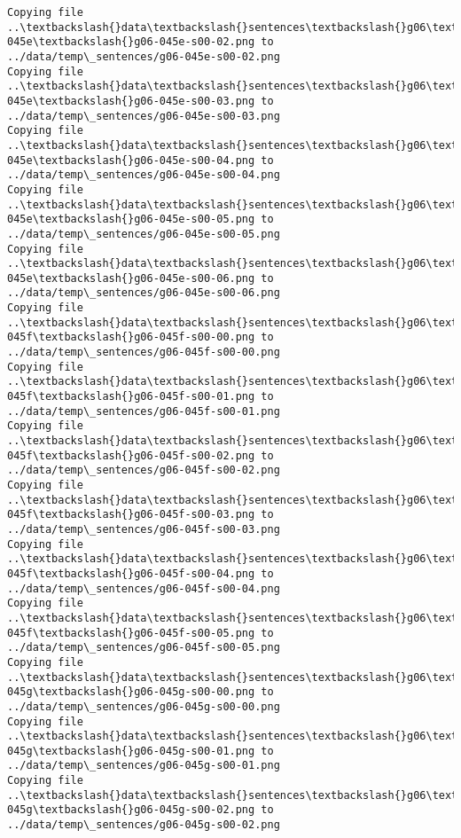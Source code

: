 \documentclass[11pt]{article}
\begin{document}
\begin{Verbatim}[commandchars=\\\{\}]
Copying file ..\textbackslash{}data\textbackslash{}sentences\textbackslash{}g06\textbackslash{}g06-045e\textbackslash{}g06-045e-s00-02.png to
../data/temp\_sentences/g06-045e-s00-02.png
Copying file ..\textbackslash{}data\textbackslash{}sentences\textbackslash{}g06\textbackslash{}g06-045e\textbackslash{}g06-045e-s00-03.png to
../data/temp\_sentences/g06-045e-s00-03.png
Copying file ..\textbackslash{}data\textbackslash{}sentences\textbackslash{}g06\textbackslash{}g06-045e\textbackslash{}g06-045e-s00-04.png to
../data/temp\_sentences/g06-045e-s00-04.png
Copying file ..\textbackslash{}data\textbackslash{}sentences\textbackslash{}g06\textbackslash{}g06-045e\textbackslash{}g06-045e-s00-05.png to
../data/temp\_sentences/g06-045e-s00-05.png
Copying file ..\textbackslash{}data\textbackslash{}sentences\textbackslash{}g06\textbackslash{}g06-045e\textbackslash{}g06-045e-s00-06.png to
../data/temp\_sentences/g06-045e-s00-06.png
Copying file ..\textbackslash{}data\textbackslash{}sentences\textbackslash{}g06\textbackslash{}g06-045f\textbackslash{}g06-045f-s00-00.png to
../data/temp\_sentences/g06-045f-s00-00.png
Copying file ..\textbackslash{}data\textbackslash{}sentences\textbackslash{}g06\textbackslash{}g06-045f\textbackslash{}g06-045f-s00-01.png to
../data/temp\_sentences/g06-045f-s00-01.png
Copying file ..\textbackslash{}data\textbackslash{}sentences\textbackslash{}g06\textbackslash{}g06-045f\textbackslash{}g06-045f-s00-02.png to
../data/temp\_sentences/g06-045f-s00-02.png
Copying file ..\textbackslash{}data\textbackslash{}sentences\textbackslash{}g06\textbackslash{}g06-045f\textbackslash{}g06-045f-s00-03.png to
../data/temp\_sentences/g06-045f-s00-03.png
Copying file ..\textbackslash{}data\textbackslash{}sentences\textbackslash{}g06\textbackslash{}g06-045f\textbackslash{}g06-045f-s00-04.png to
../data/temp\_sentences/g06-045f-s00-04.png
Copying file ..\textbackslash{}data\textbackslash{}sentences\textbackslash{}g06\textbackslash{}g06-045f\textbackslash{}g06-045f-s00-05.png to
../data/temp\_sentences/g06-045f-s00-05.png
Copying file ..\textbackslash{}data\textbackslash{}sentences\textbackslash{}g06\textbackslash{}g06-045g\textbackslash{}g06-045g-s00-00.png to
../data/temp\_sentences/g06-045g-s00-00.png
Copying file ..\textbackslash{}data\textbackslash{}sentences\textbackslash{}g06\textbackslash{}g06-045g\textbackslash{}g06-045g-s00-01.png to
../data/temp\_sentences/g06-045g-s00-01.png
Copying file ..\textbackslash{}data\textbackslash{}sentences\textbackslash{}g06\textbackslash{}g06-045g\textbackslash{}g06-045g-s00-02.png to
../data/temp\_sentences/g06-045g-s00-02.png

\end{Verbatim}
\end{document}
